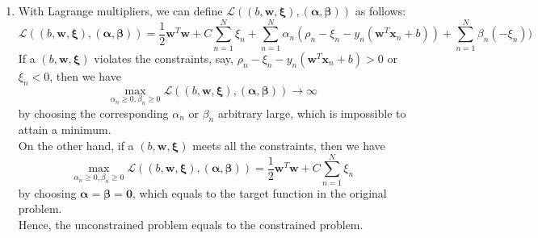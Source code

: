 \documentclass{article}
\begin{document}
\begin{CJK*}{UTF8}{bsmi}
\begin{normalsize}
\begin{enumerate}[label=\textbf{\arabic*}.]
        \item With Lagrange multipliers, we can define $\mathcal{L}((b, \mathbf{w}, \mathbf{\xi}),(\mathbf{\alpha}, \mathbf{\beta}))$ as follows:
        \[ \mathcal{L}((b, \mathbf{w}, \mathbf{\xi}),(\mathbf{\alpha}, \mathbf{\beta})) = \frac{1}{2}\mathbf{w}^T\mathbf{w}+C\sum_{n=1}^N \xi_n + \sum_{n=1}^N \alpha_n(\rho_n-\xi_n-y_n(\mathbf{w}^T\mathbf{x}_n+b)) + \sum_{n=1}^N \beta_n (-\xi_n)) \]
        If a  $(b, \mathbf{w}, \mathbf{\xi})$ violates the constraints, say, $\rho_n - \xi_n - y_n(\mathbf{w}^T \mathbf{x}_n+b) > 0$ or $\xi_n < 0$, then we have
        \[\max_{\alpha_n\ge 0, \beta_n \ge 0}\mathcal{L}((b, \mathbf{w}, \mathbf{\xi}),(\mathbf{\alpha}, \mathbf{\beta})) \to \infty\] by choosing the corresponding $\alpha_n$ or $\beta_n$ arbitrary large, which is impossible to attain a minimum.\\
        On the other hand, if a  $(b, \mathbf{w}, \mathbf{\xi})$ meets all the constraints, then we have     \[\max_{\alpha_n\ge 0, \beta_n \ge 0}{\mathcal{L}((b, \mathbf{w}, \mathbf{\xi}),(\mathbf{\alpha}, \mathbf{\beta}))} = \frac{1}{2}\mathbf{w}^T\mathbf{w}+C\sum_{n=1}^N \xi_n \] by choosing $\mathbf{\alpha} = \mathbf{\beta} = \mathbf{0}$, which equals to the target function in the original problem.\\
        Hence, the unconstrained problem equals to the constrained problem.
        

\end{enumerate}
\end{normalsize}
\end{CJK*}
\end{document}
